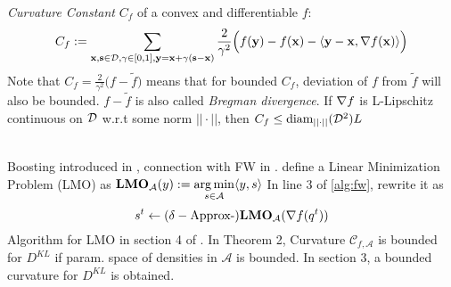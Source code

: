     \emph{Curvature Constant} $C_f$ of a convex and differentiable $f$:
    \begin{equation*}
      C_f := \sum\limits_{\mathbf{x}, \mathbf{s} \in \mathcal{D}, \gamma \in [0, 1], \mathbf{y} = \mathbf{x} + 
        \gamma(\mathbf{s} - \mathbf{x})} \frac{2}{\gamma^2}\Big(f(\mathbf{y}) - f(\mathbf{x}) - 
      \langle \mathbf{y} - \mathbf{x}, \nabla f(\mathbf{x}) \rangle \Big)
    \end{equation*}
    Note that $C_f = \frac{2}{\gamma^2}\Big(f - \tilde{f}\Big)$ means that for bounded
    $C_f$, deviation of $f$ from $\tilde{f}$ will also be bounded. $f - \tilde{f}$
    is also called \emph{Bregman divergence}. If $\nabla f$ is L-Lipschitz continuous
    on $\mathcal{D}$ w.r.t some norm $||\cdot||$, then $C_f \leq 
    \text{diam}_{||\cdot||}(\mathcal{D}^2)L$

     \INPROGRESS \\
    Boosting introduced in \cite{guo2016boosting}, connection with FW in \cite{locatello2017boosting}.
    define a Linear Minimization Problem (LMO) as
    $
    \mathbf{LMO}_{\mathcal{A}}(y) := \operatorname*{arg\,min}\limits_{s \in \mathcal{A}} \langle y, s \rangle
    $
    In line 3 of \ref{alg:fw}, rewrite it as
    $$
    s^t \gets (\delta-\text{Approx-})\mathbf{LMO}_{\mathcal{A}}(\nabla f(q^t))
    $$
    Algorithm for LMO in section 4 of \cite{locatello2018boosting}. In Theorem 2,
    Curvature $\mathcal{C}_{f,\mathcal{A}}$ is bounded for $D^{KL}$ if param. space of
    densities in $\mathcal{A}$ is bounded. In section 3, a bounded curvature for
    $D^{KL}$ is obtained.


